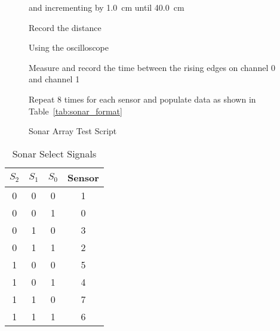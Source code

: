 \documentclass{article}
\begin{document}
\begin{figure}[htb]
\begin{framed}
\begin{enumerate*}
\begin{enumerate*}
                and incrementing by \SI{1.0}{\centi\meter} until
                \SI{40.0}{\centi\meter}
                \item Record the distance
            \end{enumerate*}
            \item Using the oscilloscope
            \begin{enumerate*}
                \item Measure and record the time between the rising edges
                on channel 0 and channel 1
            \end{enumerate*}
            \item Repeat 8 times for each sensor and populate data
            as shown in Table~\ref{tab:sonar_format}
        \end{enumerate*}
        \end{framed}
        \caption{Sonar Array Test Script}
        \label{fig:hardware_script}
    \end{figure}

    \begin{table}[htb]
        \centering
        \begin{tabular}{|c|c|c|c|}
            \hline
            $S_2$
                & $S_1$
                & $S_0$
                & \textbf{Sensor}
            \\ \hline
            0 & 0 & 0 & 1 \\ \hline
            0 & 0 & 1 & 0 \\ \hline
            0 & 1 & 0 & 3 \\ \hline
            0 & 1 & 1 & 2 \\ \hline
            1 & 0 & 0 & 5 \\ \hline
            1 & 0 & 1 & 4 \\ \hline
            1 & 1 & 0 & 7 \\ \hline
            1 & 1 & 1 & 6 \\ \hline
        \end{tabular}
        \caption{Sonar Select Signals}
        \label{tab:sonar_select}
    \end{table}
\end{document}
